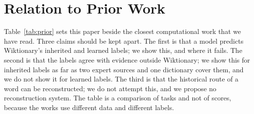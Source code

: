 \documentclass[11pt]{article}
\begin{document}
\section{Relation to Prior Work}
\label{app:prior}

Table~\ref{tab:prior} sets this paper beside the closest computational work that we have read. Three claims should be kept apart. The first is that a model predicts Wiktionary's inherited and learned labels; we show this, and where it fails. The second is that the labels agree with evidence outside Wiktionary; we show this for inherited labels as far as two expert sources and one dictionary cover them, and we do not show it for learned labels. The third is that the historical route of a word can be reconstructed; we do not attempt this, and we propose no reconstruction system. The table is a comparison of tasks and not of scores, because the works use different data and different labels.
\end{document}
